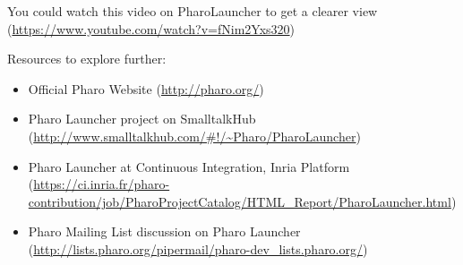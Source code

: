 \documentclass[a4paper,10pt,twoside]{book}
\begin{document}
You could watch this video on PharoLauncher to get a clearer view (\url{https://www.youtube.com/watch?v=fNim2Yxs320})

Resources to explore further: 

\begin{itemize}
\item Official Pharo Website (\url{http://pharo.org/})
\item Pharo Launcher project on SmalltalkHub  (\url{http://www.smalltalkhub.com/#!/~Pharo/PharoLauncher})
\item Pharo Launcher at Continuous Integration, Inria Platform (\url{https://ci.inria.fr/pharo-contribution/job/PharoProjectCatalog/HTML_Report/PharoLauncher.html})
\item Pharo Mailing List discussion on Pharo Launcher  (\url{http://lists.pharo.org/pipermail/pharo-dev_lists.pharo.org/})
\end{itemize}



\ifx\wholebook\relax\else
   
\end{document}

